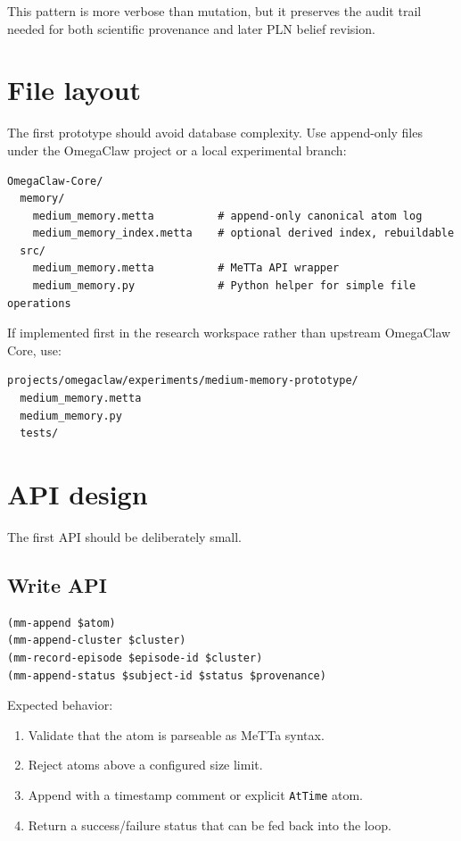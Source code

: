 \documentclass[11pt]{article}
\begin{document}
This pattern is more verbose than mutation, but it preserves the audit trail needed
for both scientific provenance and later PLN belief revision.

\section{File layout}

The first prototype should avoid database complexity.  Use append-only files under the
OmegaClaw project or a local experimental branch:

\begin{verbatim}
OmegaClaw-Core/
  memory/
    medium_memory.metta          # append-only canonical atom log
    medium_memory_index.metta    # optional derived index, rebuildable
  src/
    medium_memory.metta          # MeTTa API wrapper
    medium_memory.py             # Python helper for simple file operations
\end{verbatim}

If implemented first in the research workspace rather than upstream OmegaClaw Core,
use:

\begin{verbatim}
projects/omegaclaw/experiments/medium-memory-prototype/
  medium_memory.metta
  medium_memory.py
  tests/
\end{verbatim}

\section{API design}

The first API should be deliberately small.

\subsection{Write API}

\begin{verbatim}
(mm-append $atom)
(mm-append-cluster $cluster)
(mm-record-episode $episode-id $cluster)
(mm-append-status $subject-id $status $provenance)
\end{verbatim}

Expected behavior:
\begin{enumerate}
  \item Validate that the atom is parseable as MeTTa syntax.
  \item Reject atoms above a configured size limit.
  \item Append with a timestamp comment or explicit \texttt{AtTime} atom.
  \item Return a success/failure status that can be fed back into the loop.
\end{enumerate}
\end{document}
